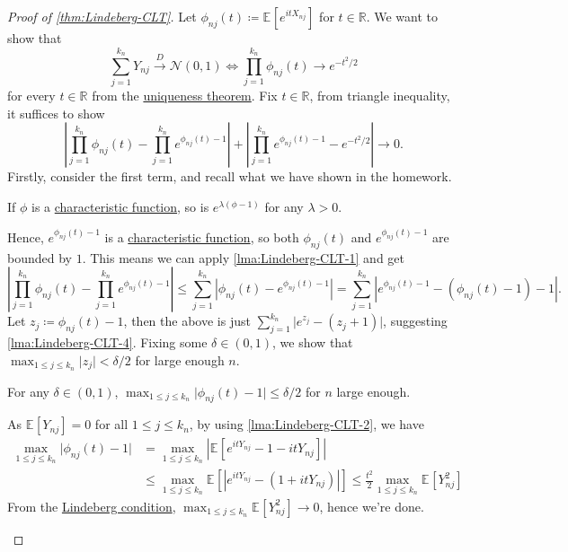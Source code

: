 \begin{proof}[Proof of \autoref{thm:Lindeberg-CLT}]
	Let \(\phi _{nj}(t) \coloneqq \mathbb{E}_{}[e^{it X_{nj}}] \) for \(t \in \mathbb{R} \). We want to show that
	\[
		\sum_{j=1}^{k_n} Y_{nj} \overset{D}{\to} \mathcal{N} (0, 1)
		\iff \prod_{j=1}^{k_n} \phi _{nj}(t) \to e^{-t^2 / 2}
	\]
	for every \(t \in \mathbb{R} \) from the \hyperref[thm:characteristic-function-uniqueness]{uniqueness theorem}. Fix \(t \in \mathbb{R} \), from triangle inequality, it suffices to show
	\[
		\left\vert \prod_{j=1}^{k_n} \phi _{nj}(t) - \prod_{j=1}^{k_n} e^{\phi _{nj}(t) - 1} \right\vert
		+ \left\vert \prod_{j=1}^{k_n} e^{\phi _{nj}(t) - 1} - e^{-t^2 / 2} \right\vert
		\to 0.
	\]
	Firstly, consider the first term, and recall what we have shown in the homework.

	\begin{prev}
		If \(\phi \) is a \hyperref[def:characteristic-function]{characteristic function}, so is \(e^{\lambda (\phi - 1)}\) for any \(\lambda > 0\).
	\end{prev}

	Hence, \(e^{\phi _{nj}(t) - 1}\) is a \hyperref[def:characteristic-function]{characteristic function}, so both \(\phi _{nj}(t)\) and \(e^{\phi _{nj}(t) - 1}\) are bounded by \(1\). This means we can apply \autoref{lma:Lindeberg-CLT-1} and get
	\[
		\left\vert \prod_{j=1}^{k_n} \phi _{nj}(t) - \prod_{j=1}^{k_n} e^{\phi _{nj}(t) - 1} \right\vert
		\leq \sum_{j=1}^{k_n} \left\vert \phi _{nj}(t) - e^{\phi _{nj}(t) - 1} \right\vert
		= \sum_{j=1}^{k_n} \left\vert e^{\phi _{nj}(t) - 1} - (\phi _{nj}(t) - 1) - 1 \right\vert.
	\]
	Let \(z_j \coloneqq \phi _{nj}(t) - 1\), then the above is just \(\sum_{j=1}^{k_n} \vert e^{z_j} - (z_j + 1) \vert \), suggesting \autoref{lma:Lindeberg-CLT-4}. Fixing some \(\delta \in (0, 1)\), we show that \(\max _{1 \leq j \leq k_n} \vert z_j \vert < \delta / 2\) for large enough \(n\).

	\begin{claim}
		For any \(\delta \in (0, 1)\), \(\max _{1 \leq j \leq k_n} \vert \phi _{nj}(t) - 1 \vert \leq \delta / 2\) for \(n\) large enough.
	\end{claim}
	\begin{explanation}
		As \(\mathbb{E}_{}[Y_{nj}] = 0\) for all \(1 \leq j \leq k_n\), by using \autoref{lma:Lindeberg-CLT-2}, we have
		\[
			\begin{split}
				\max _{1 \leq j \leq k_n} \vert \phi _{nj}(t) - 1 \vert
				 & = \max _{1 \leq j \leq k_n} \left\vert \mathbb{E}_{}[e^{i t Y_{nj}} - 1 - i t Y_{nj}]  \right\vert                \\
				 & \leq \max _{1 \leq j \leq k_n} \mathbb{E}_{}\left[\left\vert e^{it Y_{nj}} - (1 + i t Y_{nj}) \right\vert \right]
				\leq \frac{t^2}{2} \max _{1 \leq j \leq k_n} \mathbb{E}_{}[Y_{nj}^2]
			\end{split}
		\]
		From the \hyperref[def:Lindeberg-condition]{Lindeberg condition}, \(\max _{1 \leq j \leq k_n} \mathbb{E}_{}[Y_{nj}^2] \to 0\), hence we're done.
	\end{explanation}


\end{proof}
